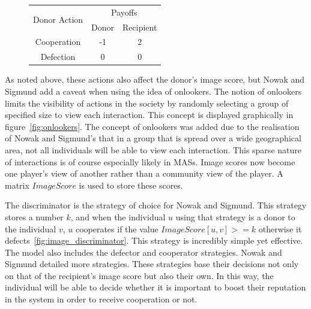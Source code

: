 \documentclass[]{final_report}
\begin{document}
\begin{figure}
\vspace{-20pt}
\begin{framed}
	\begin{center}
		\begin{tabular}{c|c|c}
		\multirow{2}{*}{Donor Action} & \multicolumn{2}{c}{Payoffs}\\	
		& Donor & Recipient\\
		\hline
		Cooperation & -1 & 2\\
		\hline
		Defection & 0 & 0\\
		\end{tabular}
		\label{tab:indirrec_payoffmatrix}
	\end{center}	
\end{framed}
\vspace{-20pt}
\end{figure}
As noted above, these actions also affect the donor's image score, but Nowak and Sigmund add a caveat when using the idea of onlookers. The notion of onlookers limits the visibility of actions in the society by randomly selecting a group of specified size to view each interaction. This concept is displayed graphically in figure~\ref{fig:onlookers}. The concept of onlookers was added due to the realisation of Nowak and Sigmund's that in a group that is spread over a wide geographical area, not all individuals will be able to view each interaction. This sparse nature of interactions is of course especially likely in MASs. Image scores now become one player's view of another rather than a community view of the player. A matrix $ImageScore$ is used to store these scores.\par
The discriminator is the strategy of choice for Nowak and Sigmund. This strategy stores a number $k$, and when the individual $u$ using that strategy is a donor to the individual $v$, $u$ cooperates if the value $ImageScore[u,v]>=k$ otherwise it defects~\ref{fig:image_discriminator}. This strategy is incredibly simple yet effective. The model also includes the defector and cooperator strategies. Nowak and Sigmund detailed more strategies. These strategies base their decisions not only on that of the recipient's image score but also their own. In this way, the individual will be able to decide whether it is important to boost their reputation in the system in order to receive cooperation or not.\par
\end{document}
